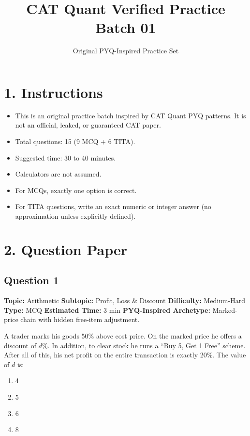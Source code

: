 \documentclass[11pt]{article}
\begin{document}
\title{CAT Quant Verified Practice Batch 01}
\author{Original PYQ-Inspired Practice Set}
\date{}
\maketitle

\section*{1. Instructions}

\begin{itemize}
  \item This is an original practice batch inspired by CAT Quant PYQ patterns. It is not an official, leaked, or guaranteed CAT paper.
  \item Total questions: 15 (9 MCQ + 6 TITA).
  \item Suggested time: 30 to 40 minutes.
  \item Calculators are not assumed.
  \item For MCQs, exactly one option is correct.
  \item For TITA questions, write an exact numeric or integer answer (no approximation unless explicitly defined).
\end{itemize}

\section*{2. Question Paper}

\subsection*{Question 1}
\textbf{Topic:} Arithmetic \quad
\textbf{Subtopic:} Profit, Loss \& Discount \quad
\textbf{Difficulty:} Medium-Hard \quad
\textbf{Type:} MCQ \quad
\textbf{Estimated Time:} 3 min \quad
\textbf{PYQ-Inspired Archetype:} Marked-price chain with hidden free-item adjustment.

\begin{tcolorbox}
A trader marks his goods 50\% above cost price. On the marked price he offers a discount of \(d\%\). In addition, to clear stock he runs a ``Buy 5, Get 1 Free'' scheme. After all of this, his net profit on the entire transaction is exactly 20\%. The value of \(d\) is:
\end{tcolorbox}

\begin{enumerate}[label=(\Alph*)]
\item 4
\item 5
\item 6
\item 8
\end{enumerate}
\end{document}
